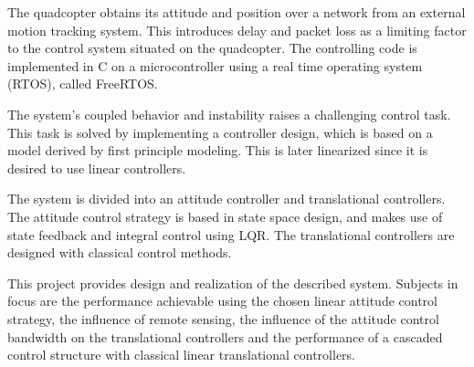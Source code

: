 The quadcopter obtains its attitude and position over a network from an external motion tracking system. This introduces delay and packet loss as a limiting factor to the control system situated on the quadcopter. The controlling code is implemented in C on a microcontroller using a real time operating system (RTOS), called FreeRTOS.

The system's coupled behavior and instability raises a challenging control task. This task is solved by implementing a controller design, which is based on a model derived by first principle modeling. This is later linearized since it is desired to use linear controllers.

The system is divided into an attitude controller and translational controllers. The attitude control strategy is based in state space design, and makes use of state feedback and integral control using LQR. The translational controllers are designed with classical control methods.

This project provides design and realization of the described system. Subjects in focus are the performance achievable using the chosen linear attitude control strategy, the influence of remote sensing, the influence of the attitude control bandwidth on the translational controllers and the performance of a cascaded control structure with classical linear translational controllers.


